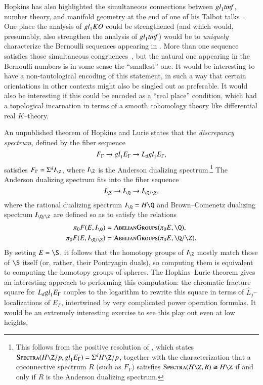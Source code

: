 Hopkins has also highlighted the simultaneous connections between $\mathit{gl}_1 \mathit{tmf}$, number theory, and manifold geometry at the end of one of his Talbot talks~\cite{HopkinsTheStringOrientation}.  One place the analysis of $\mathit{gl}_1 KO$ could be strengthened (and which would, presumably, also strengthen the analysis of $\mathit{gl}_1 \mathit{tmf}$) would be to \emph{uniquely} characterize the Bernoulli sequences appearing in .  More than one sequence satisfies those simultaneous congruences~\cite{SprangNaumann}, but the natural one appearing in the Bernoulli numbers is in some sense the ``smallest'' one.  It would be interesting to have a non-tautological encoding of this statement, in such a way that certain orientations in other contexts might also be singled out as preferable.  It would also be interesting if this could be encoded as a ``real place'' condition, which had a topological incarnation in terms of a smooth cohomology theory like differential real $K$--theory.

An unpublished theorem of Hopkins and Lurie states that the \textit{discrepancy spectrum}, defined by the fiber sequence \[F_\Gamma \to \mathit{gl}_1 E_\Gamma \to L_d \mathit{gl}_1 E_\Gamma,\] satisfies $F_\Gamma \simeq \Susp^d I_{\Z}$, where $I_{\Z}$ is the Anderson dualizing spectrum.\footnote{This follows from the positive resolution of \cite[Conjecture 5.4.14]{HopkinsLurie}, which states $\CatOf{Spectra}(H\Z/p, \gl_1 E_\Gamma) = \Susp^d H\Z/p$, together with the characterization that a coconnective spectrum $R$ (such as $F_\Gamma$) satisfies $\CatOf{Spectra}(H\Z, R) \cong H\Z$ if and only if $R$ is the Anderson dualizing spectrum.}  The Anderson dualizing spectrum fits into the fiber sequence \[I_{\Z} \to I_{\Q} \to I_{\Q/\Z},\] where the rational dualizing spectrum $I_{\Q} = H\Q$ and Brown--Comenetz dualizing spectrum $I_{\Q/\Z}$ are defined so as to satisfy the relations
\begin{align*}
\pi_0 F(E, I_{\Q}) & = \CatOf{AbelianGroups}(\pi_0 E, \Q), \\
\pi_0 F(E, I_{\Q/\Z}) & = \CatOf{AbelianGroups}(\pi_0 E, \Q/\Z).
\end{align*}
By setting $E = \S$, it follows that the homotopy groups of $I_{\Z}$ mostly match those of $\S$ itself (or, rather, their Pontryagin duals), so computing them is equivalent to computing the homotopy groups of spheres.  The Hopkins--Lurie theorem gives an interesting approach to performing this computation: the chromatic fracture square for $L_d \mathit{gl}_1 E_\Gamma$ couples to the logarithm to rewrite this square in terms of $\widehat L_j$--localizations of $E_\Gamma$, intertwined by very complicated power operation formulas.  It would be an extremely interesting exercise to see this play out even at low heights.

